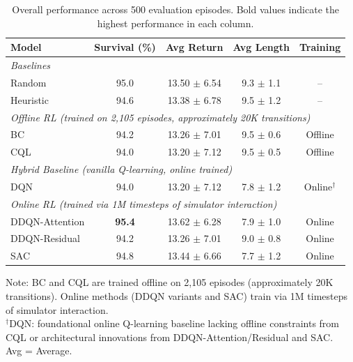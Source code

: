 \begin{table}[htbp]
\centering
\caption{Overall performance across 500 evaluation episodes. Bold values indicate the highest performance in each column.}
\label{tab:overall-performance}
\begin{tabular}{lcccc}
\toprule
\textbf{Model} & \textbf{Survival (\%)} & \textbf{Avg Return} & \textbf{Avg Length} & \textbf{Training} \\
\midrule
\multicolumn{5}{l}{\textit{Baselines}} \\
Random          & 95.0               & 13.50 $\pm$ 6.54    & 9.3 $\pm$ 1.1       & -- \\
Heuristic       & 94.6               & 13.38 $\pm$ 6.78    & 9.5 $\pm$ 1.2       & -- \\
\midrule
\multicolumn{5}{l}{\textit{Offline RL (trained on 2,105 episodes, approximately 20K transitions)}} \\
BC              & 94.2               & 13.26 $\pm$ 7.01    & 9.5 $\pm$ 0.6       & Offline \\
CQL             & 94.0               & 13.20 $\pm$ 7.12    & 9.5 $\pm$ 0.5       & Offline \\
\midrule
\multicolumn{5}{l}{\textit{Hybrid Baseline (vanilla Q-learning, online trained)}} \\
DQN             & 94.0               & 13.20 $\pm$ 7.12    & 7.8 $\pm$ 1.2       & Online$^\dagger$ \\
\midrule
\multicolumn{5}{l}{\textit{Online RL (trained via 1M timesteps of simulator interaction)}} \\
DDQN-Attention  & \textbf{95.4}      & 13.62 $\pm$ 6.28    & 7.9 $\pm$ 1.0       & Online \\
DDQN-Residual   & 94.2               & 13.26 $\pm$ 7.01    & 9.0 $\pm$ 0.8       & Online \\
SAC             & 94.8               & 13.44 $\pm$ 6.66    & 7.7 $\pm$ 1.2       & Online \\
\bottomrule
\end{tabular}
\begin{flushleft}
\scriptsize
Note: BC and CQL are trained offline on 2,105 episodes (approximately 20K transitions). Online methods (DDQN variants and SAC) train via 1M timesteps of simulator interaction. \\
$^\dagger$DQN: foundational online Q-learning baseline lacking offline constraints from CQL or architectural innovations from DDQN-Attention/Residual and SAC. \\
Avg = Average.
\end{flushleft}
\end{table}

